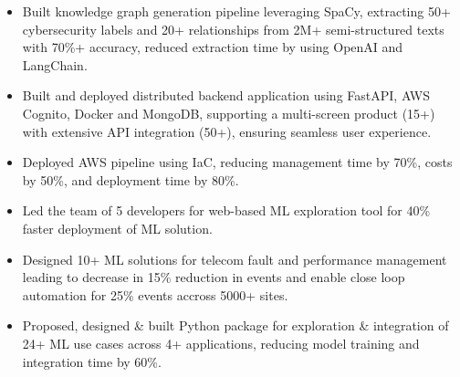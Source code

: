 \documentclass[10pt,a4paper,ragged2e,withhyper]{altacv}
\begin{document}
\par\divider\par
{}


\begin{itemize}
\item Built knowledge graph generation pipeline leveraging SpaCy, extracting 50+ cybersecurity labels and 20+ relationships from 2M+ semi-structured texts with 70\%+ accuracy, reduced extraction time by using OpenAI and LangChain.
\end{itemize}

\begin{itemize}
\item Built and deployed distributed backend application using FastAPI, AWS Cognito, Docker and MongoDB, supporting a multi-screen product (15+) with extensive API integration (50+), ensuring seamless user experience.
\item Deployed AWS pipeline using IaC, reducing management time by 70\%, costs by 50\%, and deployment time by 80\%.
\end{itemize}

\par\divider\par
{}

\begin{itemize}
\item Led the team of 5 developers for web-based ML exploration tool for 40\% faster deployment of ML solution.
\item Designed 10+ ML solutions for telecom fault and performance management leading to decrease in 15\% reduction in events and enable close loop automation for 25\% events accross 5000+ sites.
\end{itemize}


\begin{itemize}
\item Proposed, designed \& built Python package for exploration \& integration of 24+ ML use cases across 4+ applications, reducing model training and integration time by 60\%.
\end{itemize}
\end{document}
